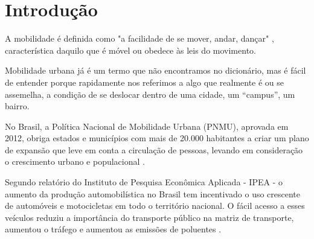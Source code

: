 %
%

\chapter{Introdução}\label{chap:introducao}  

A mobilidade é definida como "a facilidade de se mover, andar, dançar"  \cite{mobilidade}, característica daquilo que é móvel ou obedece às leis do movimento.

Mobilidade urbana já é um termo que não encontramos no dicionário, mas é fácil de entender porque rapidamente nos referimos a algo que realmente é ou se assemelha, a condição de se deslocar dentro de uma cidade, um “campus”, um bairro.

No Brasil, a Política Nacional de Mobilidade Urbana (PNMU), aprovada em 2012, obriga estados e municípios com mais de 20.000 habitantes a criar um plano de expansão que leve em conta a circulação de pessoas, levando em consideração o crescimento urbano e populacional \cite{lei12587}.

Segundo relatório do Instituto de Pesquisa Econômica Aplicada - IPEA - o aumento da produção automobilística no Brasil tem incentivado o uso crescente de automóveis e motocicletas em todo o território nacional. O fácil acesso a esses veículos reduziu a importância do transporte público na matriz de transporte, aumentou o tráfego e aumentou as emissões de poluentes \cite{ipea}.
 

